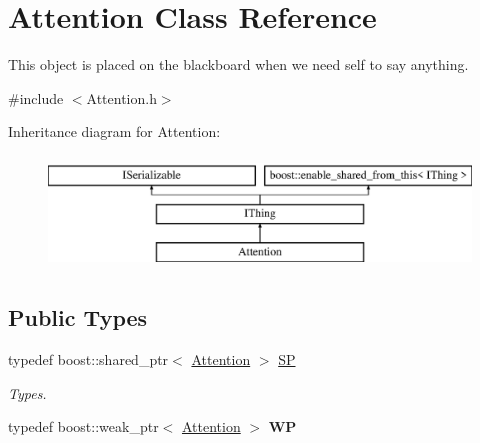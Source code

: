 \hypertarget{class_attention}{}\section{Attention Class Reference}
\label{class_attention}


This object is placed on the blackboard when we need self to say anything.  




{\ttfamily \#include $<$Attention.\+h$>$}

Inheritance diagram for Attention\+:\begin{figure}[H]
\begin{center}
\leavevmode
\includegraphics[height=3.000000cm]{class_attention}
\end{center}
\end{figure}
\subsection*{Public Types}
\begin{DoxyCompactItemize}
\item 
\mbox{\label{class_attention_ac152b0a7c507c13e8996fc7f2d5e9c31}} 
typedef boost\+::shared\+\_\+ptr$<$ \hyperlink{class_attention}{Attention} $>$ \hyperlink{class_attention_ac152b0a7c507c13e8996fc7f2d5e9c31}{SP}
\begin{DoxyCompactList}\small\item\em Types. \end{DoxyCompactList}\item 
\mbox{\label{class_attention_a3f620dc06985c6e3f447ea904da097a5}} 
typedef boost\+::weak\+\_\+ptr$<$ \hyperlink{class_attention}{Attention} $>$ {\bfseries WP}
\end{DoxyCompactItemize}
